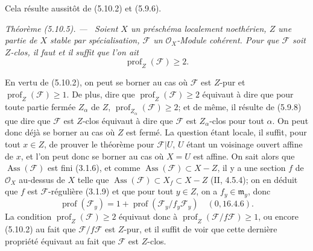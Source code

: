 \documentclass[10pt,oneside]{book}
\makeatletter
\newenvironment{theorem}[1][]{%
  \par\medskip\noindent\itshape Théorème (#1). ---\ }{\par}
\newcommand{\EGAReaderTarget}[2]{\hypertarget{#1}{}\@bsphack\begingroup\def\@currentHref{#1}\label{#2}\endgroup\@esphack}
\makeatother
\begin{document}
Cela résulte aussitôt de (5.10.2) et (5.9.6).

\begin{theorem}[5.10.5]
\EGAReaderTarget{ega4.c04.thm.5-10-5}{IV.2.s5.10.5-fr}
Soient $X$ un préschéma localement noethérien, $Z$ une partie de $X$ stable
par spécialisation, $\mathcal F$ un $\mathcal O_X$-Module cohérent. Pour que
$\mathcal F$ soit $Z$-clos, il faut et il suffit que l'on ait
\[
\operatorname{prof}_Z(\mathcal F)\geq2.
\]
\end{theorem}

En vertu de (5.10.2), on peut se borner au cas où $\mathcal F$ est $Z$-pur
et $\operatorname{prof}_Z(\mathcal F)\geq1$. De plus, dire que
$\operatorname{prof}_Z(\mathcal F)\geq2$ équivaut à dire que pour toute partie
fermée $Z_\alpha$ de $Z$, $\operatorname{prof}_{Z_\alpha}(\mathcal F)\geq2$;
et de même, il résulte de (5.9.8) que dire que $\mathcal F$ est $Z$-clos
équivaut à dire que $\mathcal F$ est $Z_\alpha$-clos pour tout $\alpha$. On
peut donc déjà se borner au cas où $Z$ est fermé. La question étant locale,
il suffit, pour tout $x\in Z$, de prouver le théorème pour $\mathcal F|U$,
$U$ étant un voisinage ouvert affine de $x$, et l'on peut donc se borner au
cas où $X=U$ est affine. On sait alors que $\operatorname{Ass}(\mathcal F)$
est fini (3.1.6), et comme
$\operatorname{Ass}(\mathcal F)\subset X-Z$, il y a une section $f$ de
$\mathcal O_X$ au-dessus de $X$ telle que
$\operatorname{Ass}(\mathcal F)\subset X_f\subset X-Z$ (II, 4.5.4); on en
déduit que $f$ est $\mathcal F$-régulière (3.1.9) et que pour tout $y\in Z$,
on a $f_y\in\mathfrak m_y$, donc
\[
\operatorname{prof}(\mathcal F_y)
=1+\operatorname{prof}(\mathcal F_y/f_y\mathcal F_y)
\quad(0, 16.4.6).
\]
La condition $\operatorname{prof}_Z(\mathcal F)\geq2$ équivaut donc à
$\operatorname{prof}_Z(\mathcal F/f\mathcal F)\geq1$, ou encore (5.10.2) au
fait que $\mathcal F/f\mathcal F$ est $Z$-pur, et il suffit de voir que cette
dernière propriété équivaut au fait que $\mathcal F$ est $Z$-clos.
\end{document}
